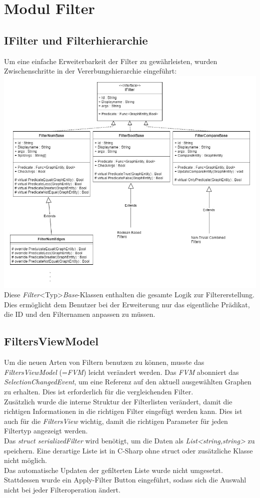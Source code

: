 \documentclass[13pt]{scrreprt}
\begin{document}
\newpage
\section{Modul Filter}
	\subsection{IFilter und  Filterhierarchie}
	Um eine einfache Erweiterbarkeit der Filter zu gewährleisten, wurden Zwischenschritte in der Vererbungshierarchie eingeführt:\\
	
	\includegraphics[scale=0.5,center]{FiltersNew.JPG}\\
	
	Diese \textit{Filter}<Typ>\textit{Base}-Klassen enthalten die gesamte Logik zur Filtererstellung. Dies ermöglicht dem Benutzer bei der Erweiterung nur das eigentliche Prädikat, die ID und den Filternamen anpassen zu müssen.
	
	\subsection{FiltersViewModel}
	Um die neuen Arten von Filtern benutzen zu können, musste das \textit{FiltersViewModel} (=\textit{FVM}) leicht verändert werden.
	Das \textit{FVM} abonniert das \textit{SelectionChangedEvent}, um eine Referenz auf den aktuell ausgewählten Graphen zu erhalten. Dies ist erforderlich für die vergleichenden Filter.
	\\
	Zusätzlich wurde die interne Struktur der Filterlisten verändert, damit die richtigen Informationen in die richtigen Filter eingefügt werden kann. Dies ist auch für die \textit{FiltersView} wichtig, damit die richtigen Parameter für jeden Filtertyp angezeigt werden.
	\\
	Das \textit{struct serializedFilter} wird benötigt, um die Daten als \textit{List<string,string>} zu speichern. Eine derartige Liste ist in C-Sharp ohne struct oder zusätzliche Klasse nicht möglich.
	\\
	Das automatische Updaten der gefilterten Liste wurde nicht umgesetzt.
	Stattdessen wurde ein Apply-Filter Button eingeführt, sodass sich die Auswahl nicht bei jeder Filteroperation ändert.
	
\end{document}
